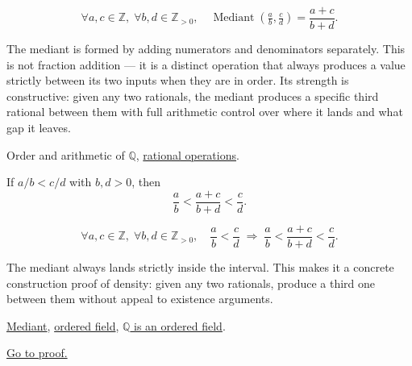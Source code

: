 \begin{remark*}
\[
\forall a,c \in \mathbb{Z},\; \forall b,d \in \mathbb{Z}_{>0},\quad
\operatorname{Mediant}\!\left(\tfrac{a}{b},\tfrac{c}{d}\right)
= \frac{a+c}{b+d}.
\]
\end{remark*}

\begin{remark*}[Interpretation]
The mediant is formed by adding numerators and denominators separately.
This is not fraction addition — it is a distinct operation that always
produces a value strictly between its two inputs when they are in order.
Its strength is constructive: given any two rationals, the mediant produces
a specific third rational between them with full arithmetic control over
where it lands and what gap it leaves.
\end{remark*}

\begin{remark*}[Dependencies]
Order and arithmetic of $\mathbb{Q}$,
\hyperref[def:rational-operations]{rational operations}.
\end{remark*}

\begin{theorem}
\label{thm:mediant-inequality}
If $a/b < c/d$ with $b, d > 0$, then
\[
\frac{a}{b} < \frac{a+c}{b+d} < \frac{c}{d}.
\]
\end{theorem}

\begin{remark*}
\[
\forall a,c \in \mathbb{Z},\; \forall b,d \in \mathbb{Z}_{>0},\quad
\frac{a}{b} < \frac{c}{d}
\;\Longrightarrow\;
\frac{a}{b} < \frac{a+c}{b+d} < \frac{c}{d}.
\]
\end{remark*}

\begin{remark*}[Interpretation]
The mediant always lands strictly inside the interval.  This makes it a
concrete construction proof of density: given any two rationals, produce
a third one between them without appeal to existence arguments.
\end{remark*}

\begin{remark*}[Dependencies]
\hyperref[def:mediant]{Mediant},
\hyperref[def:ordered-field]{ordered field},
\hyperref[thm:q-is-ordered-field]{$\mathbb{Q}$ is an ordered field}.
\end{remark*}

\begin{remark*}[Proof]
\hyperref[prf:mediant-inequality]{Go to proof.}
\end{remark*}


